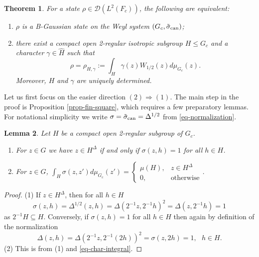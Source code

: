 \documentclass[12pt,reqno]{amsart}
\newtheorem{thm}{Theorem}
\newtheorem{lem}[thm]{Lemma}
\theoremstyle{definition}
\theoremstyle{definition}
\theoremstyle{definition}
\numberwithin{thm}{section}
\numberwithin{equation}{section}
\newcommand{\mc}[1]{\mathcal #1}
\begin{document}
\begin{thm} \label{t:finGauss}
For a state $\rho\in\mc D (L^2(F_c))$, the following are equivalent:
\begin{enumerate}
\item $\rho$ is a B-Gaussian state on the Weyl system $(G_c, \tilde{\sigma}_{\rm can})$;
\item there exist a compact open 2-regular isotropic subgroup $H\leq G_c$ and a character $\gamma\in\widehat{H}$ such that
    \begin{equation} \label{eq-finGauss}
    \rho = \rho_{H,\gamma}:= \int_H\gamma(z)W_{1/2}(z)d\mu_{G_c}(z).
\end{equation}
Moreover, $H$ and $\gamma$ are uniquely determined.
\end{enumerate}
\end{thm}


Let us first focus on the easier direction $(2)\Rightarrow(1)$. The main step in the proof is Proposition \ref{prop-fin-square}, which requires a few preparatory lemmas. For notational simplicity we write $\sigma = \tilde{\sigma}_{\rm can}=\Delta^{1/2}$ from \eqref{eq-normalization}.

  
    \begin{lem} \label{lem-fin-symplectic-complement}
    Let $H$ be a compact open 2-regular subgroup of $G_c$.
    \begin{enumerate}
    
    \item For $z\in G$ we have $z\in H^{\Delta}$ if and only if $\sigma(z,h)=1$ for all $h\in H$.
    
    \item For $z\in G$, $\displaystyle \int_H\sigma(z,z')d\mu_{G_c}(z')= \begin{cases}\mu(H), & z\in H^{\Delta}\\ 0, & \text{otherwise} \end{cases}$.
    \end{enumerate}
    \end{lem}

\begin{proof} (1) If $z\in H^{\Delta}$, then for all $h\in H$
$$\sigma(z,h)=\Delta^{1/2}(z,h)=\Delta(2^{-1}z,2^{-1}h)^2=\Delta(z,2^{-1}h)=1$$
as $2^{-1}H\subseteq H$. Conversely, if $\sigma(z,h)=1$ for all $h\in H$ then again by definition of the normalization
$$\Delta(z,h)=\Delta(2^{-1}z,2^{-1}(2h))^2=\sigma(z,2h)=1, \ \ \ h\in H.$$
(2) This is from (1) and \eqref{eq-char-integral}.
\end{proof}
 
\end{document}
